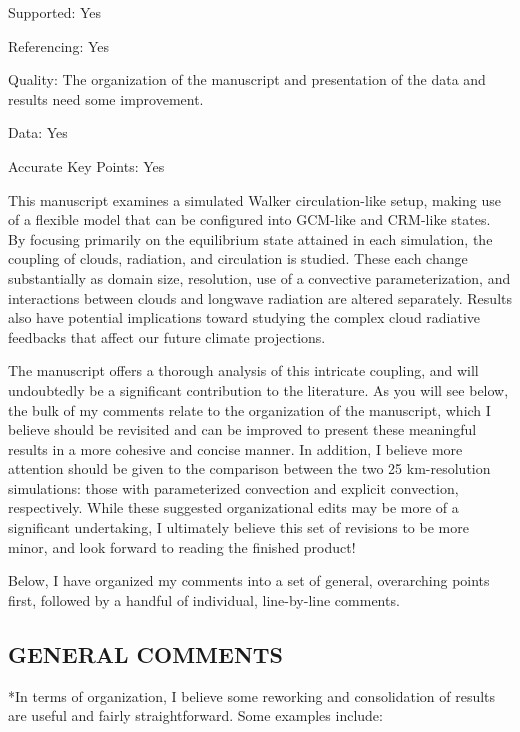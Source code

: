 \documentclass[draft]{agujournal2019}
\begin{document}
Supported: Yes

Referencing: Yes

Quality: The organization of the manuscript and presentation of the data and results need some improvement.

Data: Yes

Accurate Key Points: Yes

This manuscript examines a simulated Walker circulation-like setup, making use of a flexible model that can be configured into GCM-like and CRM-like states. By focusing primarily on the equilibrium state attained in each simulation, the coupling of clouds, radiation, and circulation is studied. These each change substantially as domain size, resolution, use of a convective parameterization, and interactions between clouds and longwave radiation are altered separately. Results also have potential implications toward studying the complex cloud radiative feedbacks that affect our future climate projections.

The manuscript offers a thorough analysis of this intricate coupling, and will undoubtedly be a significant contribution to the literature. As you will see below, the bulk of my comments relate to the organization of the manuscript, which I believe should be revisited and can be improved to present these meaningful results in a more cohesive and concise manner. In addition, I believe more attention should be given to the comparison between the two 25 km-resolution simulations: those with parameterized convection and explicit convection, respectively. While these suggested organizational edits may be more of a significant undertaking, I ultimately believe this set of revisions to be more minor, and look forward to reading the finished product!

Below, I have organized my comments into a set of general, overarching points first, followed by a handful of individual, line-by-line comments.

\subsection{GENERAL COMMENTS}
*In terms of organization, I believe some reworking and consolidation of results are useful and fairly straightforward. Some examples include:
\end{document}
